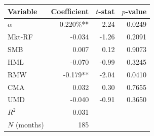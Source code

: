 \begin{tabular}{lrrr}
\toprule
Variable & Coefficient & $t$-stat & $p$-value \\
\midrule
$\alpha$ & 0.220\%** & 2.24 & 0.0249 \\
Mkt-RF & -0.034 & -1.26 & 0.2091 \\
SMB & 0.007 & 0.12 & 0.9073 \\
HML & -0.070 & -0.99 & 0.3245 \\
RMW & -0.179** & -2.04 & 0.0410 \\
CMA & 0.032 & 0.30 & 0.7655 \\
UMD & -0.040 & -0.91 & 0.3650 \\
\midrule
$R^2$ & 0.031 & & \\
$N$ (months) & 185 & & \\
\bottomrule
\end{tabular}